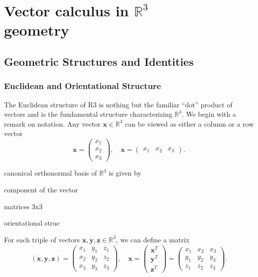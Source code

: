 \chapter[Vector calculus in $\mathbb{R}^3$ geometry]{Vector calculus in $\mathbb{R}^3$\\geometry}

\section{Geometric Structures and Identities}

\subsection{Euclidean and Orientational Structure}

The Euclidean structure of R3 is nothing but the familiar “dot” product of vectors and is the fundamental structure characterizing \(\mathbb{R}^3\). We begin with a remark on notation. Any vector \(\mathbf{x} \in \mathbb{R}^3\) can be viewed as either a column or a row vector
\[
    \mathbf{x} = \begin{pmatrix}
        x_1 \\
        x_2 \\
        x_3
    \end{pmatrix}, \quad \mathbf{x} = \begin{pmatrix}
        x_1 & x_2 & x_3
    \end{pmatrix}.
\]

canonical orthonormal basis of \(\mathbb{R}^3\) is given by

component of the vector

matrices 3x3

orientational struc

For each triple of vectors \(\mathbf{x}, \mathbf{y}, \mathbf{z} \in \mathbb{R}^3\), we can define a matrix
\[
    (\mathbf{x}, \mathbf{y}, \mathbf{z}) = \begin{pmatrix}
        x_1 & y_1 & z_1 \\
        x_2 & y_2 & z_2 \\
        x_3 & y_3 & z_3
    \end{pmatrix}, \quad \mathbf{x} = \begin{pmatrix}
        \textbf{x}^T \\
        \textbf{y}^T \\
        \mathbf{z}^T
    \end{pmatrix}= \begin{pmatrix}
        x_1 & x_2 & x_3 \\
        y_1 & y_2 & y_3 \\
        z_1 & z_2 & z_3
    \end{pmatrix}.
\]

